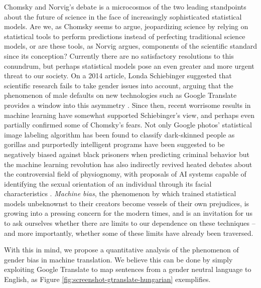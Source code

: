 \documentclass{article}
\begin{document}
Chomsky and Norvig's debate \cite{norvig2017chomsky} is a microcosmos of the two leading standpoints about the future of science in the face of increasingly sophisticated statistical models. Are we, as Chomsky seems to argue, jeopardizing science by relying on statistical tools to perform predictions instead of perfecting traditional science models, or are these tools, as Norvig argues, components of the scientific standard since its conception? Currently there are no satisfactory resolutions to this conundrum, but perhaps statistical models pose an even greater and more urgent threat to our society. On a 2014 article, Londa Schiebinger suggested that scientific research fails to take gender issues into account, arguing that the phenomenon of male defaults on new technologies such as Google Translate provides a window into this asymmetry \cite{schiebinger2014scientific}. Since then, recent worrisome results in machine learning have somewhat supported Schiebinger's view, and perhaps even partially confirmed some of Chomsky's fears. Not only Google photos' statistical image labeling algorithm has been found to classify dark-skinned people as gorillas \cite{garcia2016racist} and purportedly intelligent programs have been suggested to be negatively biased against black prisoners when predicting criminal behavior \cite{angwin2016machine} but the machine learning revolution has also indirectly revived heated debates about the controversial field of physiognomy, with proposals of AI systems capable of identifying the sexual orientation of an individual through its facial characteristics \cite{wang2017deep}. \emph{Machine bias}, the phenomenon by which trained statistical models unbeknownst to their creators become vessels of their own prejudices, is growing into a pressing concern for the modern times, and is an invitation for us to ask ourselves whether there are limits to our dependence on these techniques -- and more importantly, whether some of these limits have already been traversed.

With this in mind, we propose a quantitative analysis of the phenomenon of gender bias in machine translation. We believe this can be done by simply exploiting Google Translate to map sentences from a gender neutral language to English, as Figure \ref{fig:screenshot-gtranslate-hungarian} exemplifies.
\end{document}
